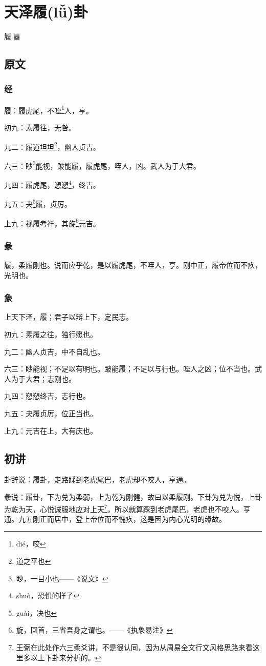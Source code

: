 \documentclass[12pt,oneside]{book}
\begin{document}
\chapter{天泽履(lǚ)卦}
履 {\Large ䷉}

\section{原文}

\subsection{经}
履：履虎尾，不咥\footnote{dié，咬}人，亨。

初九：素履往，无咎。

九二：履道坦坦\footnote{道之平也}，幽人贞吉。

六三：眇\footnote{眇，一目小也——《说文》}能视，跛能履，履虎尾，咥人，凶。武人为于大君。

九四：履虎尾，愬愬\footnote{shuò，恐惧的样子}，终吉。

九五：夬\footnote{guài，决也}履，贞厉。

上九：视履考祥，其旋\footnote{旋，回首，三省吾身之谓也。——《执象易注》}元吉。

\subsection{彖}
履，柔履刚也。说而应乎乾，是以履虎尾，不咥人，亨。刚中正，履帝位而不疚，光明也。

\subsection{象}
上天下泽，履；君子以辩上下，定民志。

初九：素履之往，独行愿也。

九二：幽人贞吉，中不自乱也。

六三：眇能视；不足以有明也。跛能履；不足以与行也。咥人之凶；位不当也。武人为于大君；志刚也。

九四：愬愬终吉，志行也。

九五：夬履贞厉，位正当也。

上九：元吉在上，大有庆也。

\section{初讲}
卦辞说：履卦，走路踩到老虎尾巴，老虎却不咬人，亨通。

彖说：履卦，下为兑为柔弱，上为乾为刚健，故曰以柔履刚。下卦为兑为悦，上卦为乾为天，心悦诚服地应对上天\footnote{王弼在此处作六三柔爻讲，不是很认同，因为从周易全文行文风格思路来看这里多以上下卦来分析的。}，所以就算踩到老虎尾巴，老虎也不咬人。亨通。九五刚正而居中，登上帝位而不愧疚，这是因为内心光明的缘故。
\end{document}
